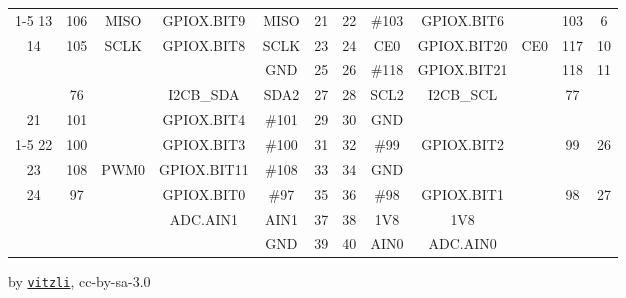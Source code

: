 \documentclass[a4paper,12pt]{article}
\newcommand{\tFPWM}[1]{\textcolor{clPWM}{#1}}
\newcommand{\tFSPI}[1]{\textcolor{clSPI}{#1}}
\newcommand{\tFIIC}[1]{\textcolor{clIIC}{#1}}
\newcommand{\sepline}{\cline{1-5}\cline{8-12}}
\newcommand{\cpwr}{\cellcolor{pwrcolor}}
\newcommand{\cgpio}{\cellcolor{gpiocolor}}
\newcommand{\cspc}{\cellcolor{specialcolor}}
\newcommand{\tfl}{\textendash}
\begin{document}
\begin{center}
\begin{tabular}{ccccc|cc|ccccc}
\sepline
 13    & 106    & \tFSPI{MISO}    & GPIOX.BIT9     & MISO  & \cgpio{}21    & \cgpio{}22   & \#103 & GPIOX.BIT6     &                 & 103    & 6     \\
 14    & 105    & \tFSPI{SCLK}    & GPIOX.BIT8     & SCLK  & \cgpio{}23    & \cgpio{}24   & CE0   & GPIOX.BIT20    & \tFSPI{CE0}     & 117    & 10    \\
 \tfl  & \tfl   &                 & \tfl           & GND   & \cpwr{}25     & \cgpio{}26   & \#118 & GPIOX.BIT21    &                 & 118    & 11    \\
 \tfl  & 76     &                 & \tFIIC{I2CB\_SDA}      & SDA2  & \cspc{}27     & \cspc{}28    & SCL2  & \tFIIC{I2CB\_SCL}      &                 & 77     & \tfl    \\
 21    & 101    &                 & GPIOX.BIT4     & \#101 & \cgpio{}29    & \cpwr{}30    & GND   & \tfl           &                 & \tfl   &       \\
\sepline
 22    & 100    &                 & GPIOX.BIT3     & \#100 & \cgpio{}31    & \cgpio{}32   & \#99  & GPIOX.BIT2     &                 & 99     & 26    \\
 23    & 108    & \tFPWM{PWM0}    & GPIOX.BIT11    & \#108 & \cgpio{}33    & \cpwr{}34    & GND   & \tfl           &                 & \tfl   & \tfl    \\
 24    & 97     &                 & GPIOX.BIT0     & \#97  & \cgpio{}35    & \cgpio{}36   & \#98  & GPIOX.BIT1     &                 & 98     & 27    \\
 \tfl  & \tfl   &                 & ADC.AIN1       & AIN1  & \cspc{}37     & \cpwr{}38    & 1V8   & 1V8            &                 & \tfl   & \tfl    \\
 \tfl  & \tfl   &                 & \tfl           & GND   & \cpwr{}39     & \cspc{}40    & AIN0  & ADC.AIN0       &                 & \tfl   & \tfl    \\
\hline
\end{tabular}
\end{center}

{\scriptsize{}\textcolor{madeby}{by \texttt{\href{https://github.com/vitzli/odroid-c1-pinmap}{vitzli}}, cc-by-sa-3.0}}
\end{document}
